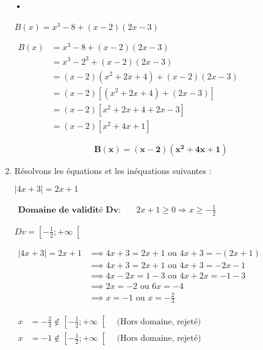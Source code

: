 \documentclass[12pt,a4paper]{article}
\begin{document}
\begin{enumerate}
\paragraph{•}   
\(
B(x) = x^3 - 8 + (x - 2)(2x - 3)
\)

\(
\begin{aligned}
B(x) &= x^3 - 8 + (x - 2)(2x - 3) \\
     &= x^3 - 2^3 + (x - 2)(2x - 3) \\
     &= (x - 2)(x^2 + 2x + 4) + (x - 2)(2x - 3) \\
     &= (x - 2) \left[(x^2 + 2x + 4) + (2x - 3) \right] \\
     &= (x - 2) \left[x^2 + 2x + 4 + 2x - 3 \right] \\
     &= (x - 2) \left[x^2 + 4x + 1 \right]
\end{aligned}
\)

\begin{tcolorbox}[colback=yellow!20, colframe=black, sharp corners]
    \[
    \mathbf{B(x) = (x - 2)(x^2 + 4x + 1)}
    \]
\end{tcolorbox}
    
    \item Résolvons les équations et les inéquations suivantes :
    
    \( |4x + 3| = 2x + 1 \)

\(
\begin{aligned}
\textbf{Domaine de validité Dv:} & \quad 2x + 1 \geq 0 \Rightarrow x \geq -\frac{1}{2}
\end{aligned}
\)

\( Dv= \left[-\frac{1}{2};+\infty\right[ \)

\(
\begin{aligned}
|4x + 3| = 2x + 1 &\implies 4x + 3 = 2x + 1 \text{ ou } 4x + 3 = - (2x + 1) \\
                   &\implies 4x + 3 = 2x + 1 \text{ ou } 4x + 3 = -2x - 1 \\
                   &\implies 4x - 2x = 1 - 3 \text{ ou } 4x + 2x = -1 - 3 \\
                   &\implies 2x = -2 \text{ ou } 6x = -4 \\
                   &\implies x = -1 \text{ ou } x = -\frac{2}{3}
\end{aligned}
\)


\(
\begin{aligned}
x &= -\frac{2}{3}\notin \left[-\frac{1}{2};+\infty\right[ \quad \text{(Hors domaine, rejeté)}\\
x &= -1\notin \left[-\frac{1}{2};+\infty\right[ \quad \text{(Hors domaine, rejeté)}
\end{aligned}
\)


\end{enumerate}
\end{document}

